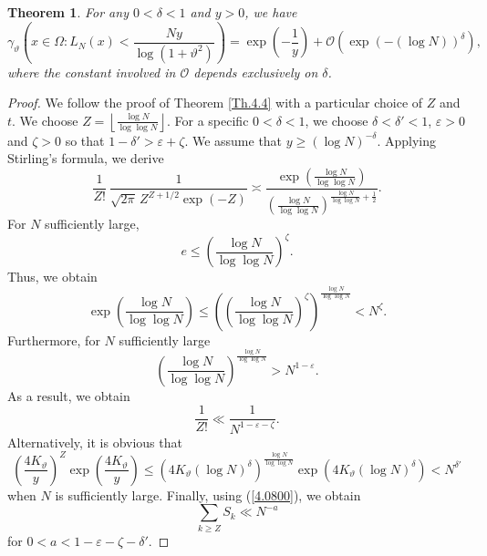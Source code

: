\documentclass[final,1p,times]{elsarticle}
\newtheorem{theorem}{Theorem}[section]
\numberwithin{equation}{section}
\begin{document}
\begin{theorem} \label{Th.4.5}
For any $0<\delta <1$ and $y>0$, we have
%
\begin{equation} \label{4.11}
\gamma_{\vartheta}\left( x \in \Omega: L_N(x) < \frac{N y}{\log\left(1+\vartheta^2 \right) } \right) = \exp\left( -\frac{1}{y}\right) +\mathcal{O}\left( \exp\left( -(\log N)\right)^{\delta} \right),
\end{equation}
where the constant involved in $\mathcal{O}$ depends exclusively on $\delta$.
%
\end{theorem}
%
\begin{proof}
We follow the proof of Theorem \ref{Th.4.4} with a particular choice of $Z$ and $t$. 
We choose $Z = \left \lfloor \frac{\log N}{\log \log N}\right \rfloor$. 
For a specific $0<\delta <1$, we choose $\delta < \delta' < 1$, $\varepsilon >0$ and $\zeta > 0$ so that $1 - \delta' > \varepsilon + \zeta$. 
We assume that $y \geq (\log N)^{-\delta}$. 
Applying Stirling's formula, we derive
\[
\frac{1}{Z!} ~ \frac{1}{\sqrt{2\pi} \, Z^{Z+1/2} \exp(-Z)} \asymp \frac{\exp\left(\frac{\log N}{\log \log N} \right)}{\left( \frac{\log N}{\log \log N} \right)^{\frac{\log N}{\log \log N} +\frac{1}{2}}  }.
\]
For $N$ sufficiently large,
\[
e \leq \left( \frac{\log N}{\log \log N} \right)^{\zeta}.
\]
Thus, we obtain
\[
\exp\left(\frac{\log N}{\log \log N} \right) \leq \left( \left( \frac{\log N}{\log \log N} \right)^{\zeta} \right)^{\frac{\log N}{\log \log N}} < N^{\zeta}.
\]
Furthermore, for $N$ sufficiently large
\[
\left( \frac{\log N}{\log \log N} \right)^{\frac{\log N}{\log \log N}} > N^{1-\varepsilon}.
\]
As a result, we obtain
\begin{equation} \label{4.12}
\frac{1}{Z!} \ll \frac{1}{N^{1-\varepsilon-\zeta}}.
\end{equation}
Alternatively, it is obvious that
\[
\left(\frac{4K_{\vartheta}}{y}\right)^Z \exp\left(\frac{4K_{\vartheta}}{y}\right) \leq \left( 4K_{\vartheta}\left( \log N \right)^{\delta} \right)^{\frac{\log N}{\log \log N}} \exp \left( 4K_{\vartheta}\left( \log N \right)^{\delta} \right) < N^{\delta'}
\]
when $N$ is sufficiently large. 
Finally, using (\ref{4.0800}), we obtain
\begin{equation} \label{4.13}
\sum_{k \geq Z} S_k \ll N^{-a}
\end{equation}
for $0 < a < 1-\varepsilon - \zeta - \delta'$. 


\end{proof}
\end{document}
